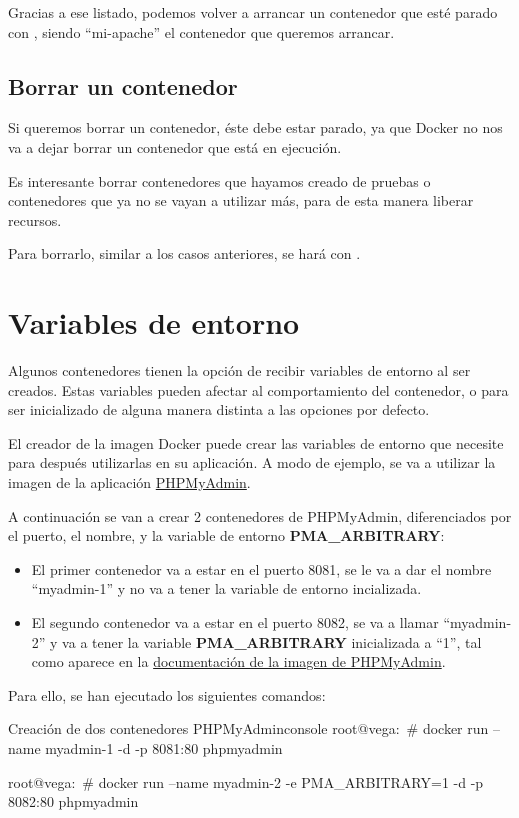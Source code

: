 Gracias a ese listado, podemos volver a arrancar un contenedor que esté parado con , siendo “mi-apache” el contenedor que queremos arrancar.

\subsection{Borrar un contenedor}
Si queremos borrar un contenedor, éste debe estar parado, ya que Docker no nos va a dejar borrar un contenedor que está en ejecución.

Es interesante borrar contenedores que hayamos creado de pruebas o contenedores que ya no se vayan a utilizar más, para de esta manera liberar recursos.

Para borrarlo, similar a los casos anteriores, se hará con .

\section{Variables de entorno}
Algunos contenedores tienen la opción de recibir variables de entorno al ser creados. Estas variables pueden afectar al comportamiento del contenedor, o para ser inicializado de alguna manera distinta a las opciones por defecto.

El creador de la imagen Docker puede crear las variables de entorno que necesite para después utilizarlas en su aplicación. A modo de ejemplo, se va a utilizar la imagen de la aplicación \href{https://hub.docker.com/_/phpmyadmin}{PHPMyAdmin}.

A continuación se van a crear 2 contenedores de PHPMyAdmin, diferenciados por el puerto, el nombre, y la variable de entorno \textbf{PMA\_ARBITRARY}:
\begin{itemize}
    \item El primer contenedor va a estar en el puerto 8081, se le va a dar el nombre “myadmin-1” y no va a tener la variable de entorno incializada.
    \item El segundo contenedor va a estar en el puerto 8082, se va a llamar “myadmin-2” y va a tener la variable \textbf{PMA\_ARBITRARY} inicializada a “1”, tal como aparece en la \href{https://hub.docker.com/_/phpmyadmin}{documentación de la imagen de PHPMyAdmin}.
\end{itemize}

Para ello, se han ejecutado los siguientes comandos:

\begin{mycode}{Creación de dos contenedores PHPMyAdmin}{console}{{\footnotesize }}
root@vega:~# docker run --name myadmin-1 -d -p 8081:80 phpmyadmin

root@vega:~# docker run --name myadmin-2 -e PMA_ARBITRARY=1 -d -p 8082:80 phpmyadmin
\end{mycode}

